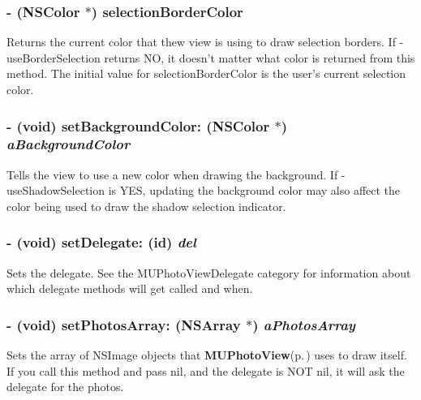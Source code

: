 \subsubsection{\setlength{\rightskip}{0pt plus 5cm}- (NSColor $\ast$) selection\-Border\-Color }\label{interface_m_u_photo_view_79dc5ca057a4e0743951c4b30249acd5}


Returns the current color that thew view is using to draw selection borders. If -use\-Border\-Selection returns NO, it doesn't matter what color is returned from this method. The initial value for selection\-Border\-Color is the user's current selection color. 
\subsubsection{\setlength{\rightskip}{0pt plus 5cm}- (void) set\-Background\-Color: (NSColor $\ast$) {\em a\-Background\-Color}}\label{interface_m_u_photo_view_8fdc07962b9b4940574851faef31acf4}


Tells the view to use a new color when drawing the background. If -use\-Shadow\-Selection is YES, updating the background color may also affect the color being used to draw the shadow selection indicator. 
\subsubsection{\setlength{\rightskip}{0pt plus 5cm}- (void) set\-Delegate: (id) {\em del}}\label{interface_m_u_photo_view_d4f5e3701dcc2cd0430036e6a62112c8}


Sets the delegate. See the MUPhoto\-View\-Delegate category for information about which delegate methods will get called and when. 
\subsubsection{\setlength{\rightskip}{0pt plus 5cm}- (void) set\-Photos\-Array: (NSArray $\ast$) {\em a\-Photos\-Array}}\label{interface_m_u_photo_view_0f84566d69ca6b60ab49920abb5f9262}


Sets the array of NSImage objects that {\bf MUPhoto\-View}{\rm (p.\,\pageref{interface_m_u_photo_view})} uses to draw itself. If you call this method and pass nil, and the delegate is NOT nil, it will ask the delegate for the photos. 
